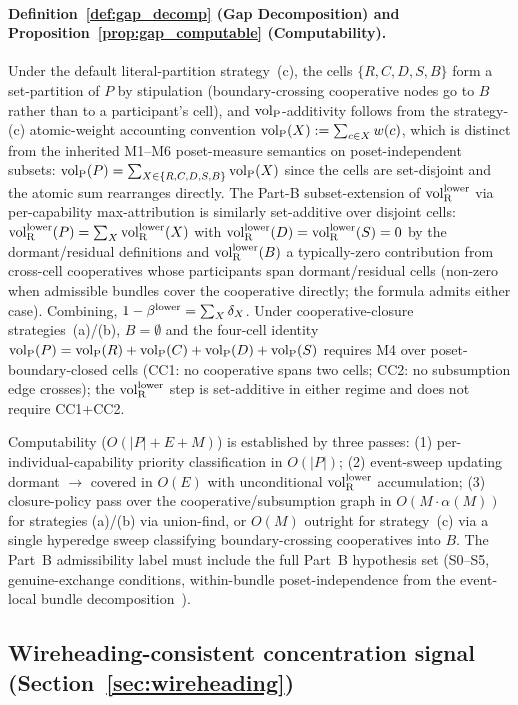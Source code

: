 \paragraph{Definition~\ref{def:gap_decomp} (Gap Decomposition)
and Proposition~\ref{prop:gap_computable} (Computability).}
Under the default literal-partition strategy~(c), the cells
$\{R, C, D, S, B\}$ form a set-partition of $P$ by stipulation
(boundary-crossing cooperative nodes go to $B$ rather than to a
participant's cell), and ${\operatorname{vol}_{\mathrm{P}}}$-additivity follows from the
strategy-(c) atomic-weight accounting convention
${\operatorname{vol}_{\mathrm{P}}}(X) := \sum_{c \in X} w(c)$, which is distinct from the
inherited M1--M6 poset-measure semantics on
poset-independent subsets:
${\operatorname{vol}_{\mathrm{P}}}(P) = \sum_{X \in \{R,C,D,S,B\}} {\operatorname{vol}_{\mathrm{P}}}(X)$ since the
cells are set-disjoint and the atomic sum rearranges directly.  The Part-B subset-extension of ${\operatorname{vol}_{\mathrm{R}}^{\mathrm{lower}}}$ via
per-capability max-attribution
\citep[Revealed~Sacrifice]{lasser2026paper8a} is similarly
set-additive over disjoint cells:
${\operatorname{vol}_{\mathrm{R}}^{\mathrm{lower}}}(P) = \sum_X {\operatorname{vol}_{\mathrm{R}}^{\mathrm{lower}}}(X)$ with ${\operatorname{vol}_{\mathrm{R}}^{\mathrm{lower}}}(D) =
{\operatorname{vol}_{\mathrm{R}}^{\mathrm{lower}}}(S) = 0$ by the dormant/residual definitions and
${\operatorname{vol}_{\mathrm{R}}^{\mathrm{lower}}}(B)$ a typically-zero contribution from cross-cell
cooperatives whose participants span dormant/residual cells
(non-zero when admissible bundles cover the cooperative
directly; the formula admits either case).  Combining,
$1 - \beta^{\mathrm{lower}} = \sum_X \delta_X$.  Under cooperative-closure
strategies~(a)/(b), $B = \emptyset$ and the four-cell identity
${\operatorname{vol}_{\mathrm{P}}}(P) = {\operatorname{vol}_{\mathrm{P}}}(R) + {\operatorname{vol}_{\mathrm{P}}}(C) + {\operatorname{vol}_{\mathrm{P}}}(D) + {\operatorname{vol}_{\mathrm{P}}}(S)$ requires
M4 over poset-boundary-closed cells (CC1: no cooperative spans
two cells; CC2: no subsumption edge crosses); the ${\operatorname{vol}_{\mathrm{R}}^{\mathrm{lower}}}$
step is set-additive in either regime and does not require
CC1+CC2.

Computability ($O(|P| + E + M)$) is established by three
passes: (1) per-individual-capability priority classification
in $O(|P|)$; (2) event-sweep updating dormant $\to$ covered in
$O(E)$ with unconditional ${\operatorname{vol}_{\mathrm{R}}^{\mathrm{lower}}}$ accumulation; (3)
closure-policy pass over the cooperative/subsumption graph in
$O(M \cdot \alpha(M))$ for strategies (a)/(b) via union-find,
or $O(M)$ outright for strategy~(c) via a single hyperedge
sweep classifying boundary-crossing cooperatives into $B$.
The Part~B admissibility label must include the full Part~B
hypothesis set (S0--S5, genuine-exchange conditions,
within-bundle poset-independence from the event-local bundle
decomposition~\citep[Revealed~Sacrifice]{lasser2026paper8a}).

\subsection{Wireheading-consistent concentration signal
(Section~\ref{sec:wireheading})}

